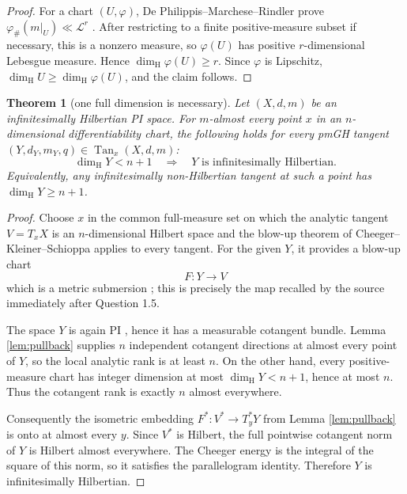 \documentclass[11pt]{article}
\newtheorem{theorem}{Theorem}
\newcommand{\Tan}{\operatorname{Tan}}
\newcommand{\dimH}{\dim_{\mathrm H}}
\begin{document}
\begin{proof}
For a chart \((U,\varphi)\), De Philippis--Marchese--Rindler prove
\(\varphi_\#(m|_U)\ll\mathcal L^r\) \cite[Theorem 1.1]{dpmr}.
After restricting to a finite positive-measure subset if necessary, this is a
nonzero measure, so \(\varphi(U)\) has positive \(r\)-dimensional Lebesgue
measure. Hence \(\dimH\varphi(U)\geq r\). Since \(\varphi\) is Lipschitz,
\(\dimH U\geq\dimH\varphi(U)\), and the claim follows.
\end{proof}

\begin{theorem}[one full dimension is necessary]\label{thm:gap}
Let \((X,d,m)\) be an infinitesimally Hilbertian PI space. For \(m\)-almost
every point \(x\) in an \(n\)-dimensional differentiability chart, the
following holds for every pmGH tangent
\((Y,d_Y,m_Y,q)\in\Tan_x(X,d,m)\):
\[
 \boxed{\quad \dimH Y<n+1\quad\Longrightarrow\quad
 Y\text{ is infinitesimally Hilbertian}.\quad}
\]
Equivalently, any infinitesimally non-Hilbertian tangent at such a point has
\(\dimH Y\geq n+1\).
\end{theorem}

\begin{proof}
Choose \(x\) in the common full-measure set on which the analytic tangent
\(V=T_xX\) is an \(n\)-dimensional Hilbert space and the blow-up theorem of
Cheeger--Kleiner--Schioppa applies to every tangent. For the given \(Y\), it
provides a blow-up chart
\[
 F:Y\longrightarrow V
\]
which is a metric submersion \cite[Theorem 1.12]{cks}; this is precisely the
map recalled by the source immediately after Question 1.5.

The space \(Y\) is again PI \cite{source}, hence it has a measurable
cotangent bundle. Lemma \ref{lem:pullback} supplies \(n\) independent
cotangent directions at almost every point of \(Y\), so the local analytic
rank is at least \(n\). On the other hand, every positive-measure chart has
integer dimension at most \(\dimH Y<n+1\), hence at most \(n\). Thus the
cotangent rank is exactly \(n\) almost everywhere.

Consequently the isometric embedding
\(F^*:V^*\to T_y^*Y\) from Lemma \ref{lem:pullback} is onto at almost every
\(y\). Since \(V^*\) is Hilbert, the full pointwise cotangent norm of \(Y\) is
Hilbert almost everywhere. The Cheeger energy is the integral of the square
of this norm, so it satisfies the parallelogram identity. Therefore \(Y\) is
infinitesimally Hilbertian.
\end{proof}
\end{document}
